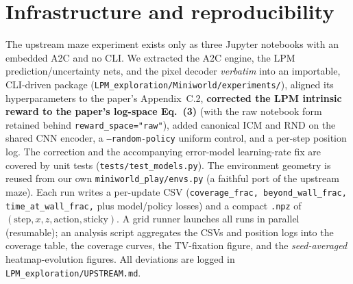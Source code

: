 \documentclass[11pt]{article}
\begin{document}
\clearpage
\section{Infrastructure and reproducibility}
The upstream maze experiment exists only as three Jupyter notebooks with an embedded A2C and no CLI.
We extracted the A2C engine, the LPM prediction/uncertainty nets, and the pixel decoder
\emph{verbatim} into an importable, CLI-driven package
(\texttt{LPM\_exploration/Miniworld/experiments/}), aligned its hyperparameters to the paper's
Appendix~C.2, \textbf{corrected the LPM intrinsic reward to the paper's log-space Eq.~(3)} (with the
raw notebook form retained behind \texttt{reward\_space="raw"}), added canonical ICM and RND on the
shared CNN encoder, a \texttt{--random-policy} uniform control, and a per-step position log. The
correction and the accompanying error-model learning-rate fix are covered by unit tests
(\texttt{tests/test\_models.py}). The environment geometry is reused from our own
\texttt{miniworld\_play/envs.py} (a faithful port of the upstream maze). Each run writes a per-update
CSV (\texttt{coverage\_frac, beyond\_wall\_frac, time\_at\_wall\_frac,} plus model/policy losses) and
a compact \texttt{.npz} of $(\text{step}, x, z, \text{action}, \text{sticky})$. A grid runner
launches all runs in parallel (resumable); an analysis script aggregates the CSVs and position logs
into the coverage table, the coverage curves, the TV-fixation figure, and the
\emph{seed-averaged} heatmap-evolution figures. All deviations are logged in
\texttt{LPM\_exploration/UPSTREAM.md}.
\end{document}
